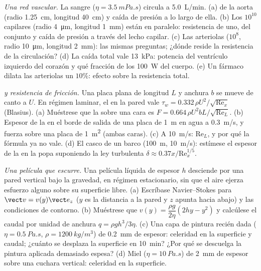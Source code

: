 \begin{exercise}[$\star\star\star$]\label{exo:b2:viscous-flows:10}
\emph{Una red vascular.} La sangre ($\eta = \qty{3.5}{mPa.s}$) circula a
\qty{5.0}{L/min}. (a)  de la aorta (radio \qty{1.25}{cm},
longitud \qty{40}{cm}) y caída de presión a lo largo de ella. (b) Los $10^{10}$
capilares (radio \qty{4}{\micro m}, longitud \qty{1}{mm}) están en paralelo:
resistencia de uno, del conjunto y caída de presión a través del lecho
capilar. (c) Las arteriolas ($10^8$, radio \qty{10}{\micro m}, longitud
\qty{2}{mm}): las mismas preguntas; ¿dónde reside la resistencia de la circulación?
(d) La caída total vale \qty{13}{kPa}: potencia del ventrículo izquierdo del
corazón y qué fracción de los \qty{100}{W} del cuerpo. (e) Un fármaco dilata las
arteriolas un $10\%$: efecto sobre la resistencia total.
\end{exercise}

\begin{exercise}[$\star\star\star$]\label{exo:b2:viscous-flows:11}
\emph{ y resistencia de fricción.} Una placa plana de longitud $L$ y
anchura $b$ se mueve de canto a $U$. En régimen laminar, el  en la pared vale $\tau_w = 0.332\,\rho U^2/\sqrt{\mathrm{Re}_x}$ (Blasius). (a) Muéstrese que
la  sobre una cara es $F = 0.664\,\rho U^2bL/\sqrt{\mathrm{Re}_L}$.
(b) Espesor de la  en el borde de salida de una placa de \qty{1}{m}
en agua a \qty{0.3}{m/s}, y fuerza sobre una placa de \qty{1}{m^2} (ambas
caras). (c) A \qty{10}{m/s}: $\mathrm{Re}_L$, y por qué la fórmula ya no
vale. (d) El casco de un barco (\qty{100}{m}, \qty{10}{m/s}): estímese el espesor
de la  en la popa suponiendo la ley turbulenta $\delta \approx
0.37x/\mathrm{Re}_x^{1/5}$.
\end{exercise}

\begin{exercise}[$\star\star\star$]\label{exo:b2:viscous-flows:12}
\emph{Una película que escurre.} Una película líquida de espesor $h$
desciende por una pared vertical bajo la gravedad, en régimen estacionario,
sin que el aire ejerza esfuerzo alguno sobre su superficie libre. (a) Escríbase Navier--Stokes para $\vect v = v(y)\vect e_z$ ($y$
es la distancia a la pared y $z$ apunta hacia abajo) y las condiciones de contorno.
(b) Muéstrese que $v(y) = \dfrac{\rho g}{2\eta}(2hy - y^2)$ y calcúlese el caudal
por unidad de anchura $q = \rho gh^3/3\eta$. (c) Una capa de pintura recién dada ($\eta =
\qty{0.5}{Pa.s}$, $\rho = \qty{1200}{kg/m^3}$) de \qty{0.2}{mm} de espesor: celeridad
en la superficie y caudal; ¿cuánto se desplaza la superficie en \qty{10}{min}? ¿Por
qué se descuelga la pintura aplicada demasiado espesa? (d) Miel ($\eta = \qty{10}{Pa.s}$)
de \qty{2}{mm} de espesor sobre una cuchara vertical: celeridad en la superficie.
\end{exercise}

